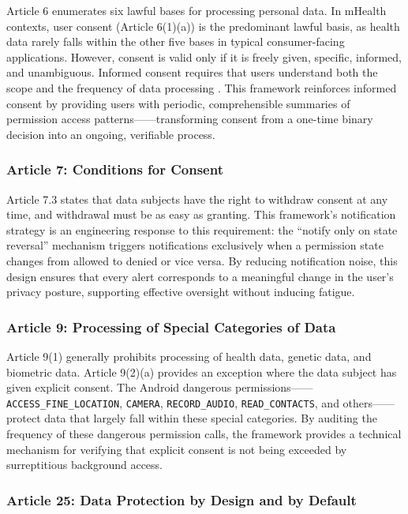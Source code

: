 Article 6 enumerates six lawful bases for processing personal data. In mHealth contexts, user consent (Article 6(1)(a)) is the predominant lawful basis, as health data rarely falls within the other five bases in typical consumer-facing applications. However, consent is valid only if it is freely given, specific, informed, and unambiguous. Informed consent requires that users understand both the scope and the frequency of data processing \cite{14}. This framework reinforces informed consent by providing users with periodic, comprehensible summaries of permission access patterns——transforming consent from a one-time binary decision into an ongoing, verifiable process.

\subsubsection{Article 7: Conditions for Consent}

Article 7.3 states that data subjects have the right to withdraw consent at any time, and withdrawal must be as easy as granting. This framework's notification strategy is an engineering response to this requirement: the ``notify only on state reversal'' mechanism triggers notifications exclusively when a permission state changes from allowed to denied or vice versa. By reducing notification noise, this design ensures that every alert corresponds to a meaningful change in the user's privacy posture, supporting effective oversight without inducing fatigue.

\subsubsection{Article 9: Processing of Special Categories of Data}

Article 9(1) generally prohibits processing of health data, genetic data, and biometric data. Article 9(2)(a) provides an exception where the data subject has given explicit consent. The Android dangerous permissions——\texttt{ACCESS\_FINE\_LOCATION}, \texttt{CAMERA}, \texttt{RECORD\_AUDIO}, \texttt{READ\_CONTACTS}, and others——protect data that largely fall within these special categories. By auditing the frequency of these dangerous permission calls, the framework provides a technical mechanism for verifying that explicit consent is not being exceeded by surreptitious background access.

\subsubsection{Article 25: Data Protection by Design and by Default}


